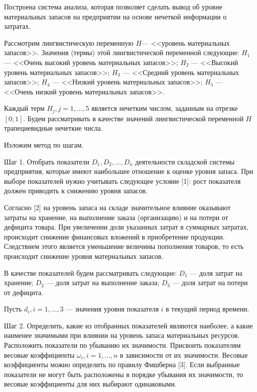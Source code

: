 \documentclass{vzmsthesis}
\begin{document}

\vzmscaption

Построена система анализа, которая позволяет сделать вывод об уровне материальных запасов на предприятии на основе нечеткой информации о затратах. 

Рассмотрим лингвистическую переменную $H$--- <<уровень материальных запасов>>. Значения (термы) этой лингвистической переменной следующие:
$H_{1}$ --- <<Очень высокий уровень материальных запасов>>; 
$H_{2}$ --- <<Высокий уровень материальных запасов>>; 
$H_{3}$ --- <<Средний уровень материальных запасов>>; 
$H_{4}$ --- <<Низкий уровень материальных запасов>>; 
$H_{5}$ --- <<Очень низкий уровень материальных запасов>>.


Каждый терм $H_{j}, j = 1, \ldots, 5$ является нечетким числом, заданным на отрезке $[0; 1]$. Будем рассматривать в качестве значений лингвистической переменной $H$ трапециевидные нечеткие числа.

Изложим метод по шагам. 

Шаг 1. Отобрать показатели $D_{1}, D_{2}, \ldots, D_{n}$ деятельности складской системы предприятия, которые имеют наибольшее отношение к оценке уровня запаса. При выборе показателей нужно учитывать следующее условие [1]: рост показателя должен приводить к снижению уровня запасов. 

Согласно [2] на уровень запаса на складе значительное влияние оказывают затраты на хранение, на выполнение заказа (организацию) и на потери от дефицита товара. При увеличении доли указанных затрат в суммарных затратах, происходит снижение финансовых вложений в приобретение продукции. Следствием этого является уменьшение величины пополнения товаров, то есть происходит снижение уровня материальных запасов.

В качестве показателей будем рассматривать следующие:
$D_{1}$ --- доля затрат на хранение;
$D_{2}$ --- доля затрат на выполнение заказа;
$D_{3}$ --- доля затрат на потери от дефицита.

Пусть $d_{i}, i = 1, \ldots, 3$ --- значения уровня показателя $i$ в текущий период времени.

Шаг 2.
Определить, какие из отобранных показателей являются наиболее, а какие наименее значимыми при влиянии на уровень запаса материальных ресурсов. Расположить показатели по убыванию их значимости.
Присвоить показателям весовые коэффициенты $\omega_{i}, i = 1, \ldots, n$ в зависимости от их значимости. 
Весовые коэффициенты можно определить по правилу Фишберна [3].
Если выбранные показатели не могут быть расположены в порядке убывания их значимости, то весовые коэффициенты для них выбирают одинаковыми.
\end{document}
